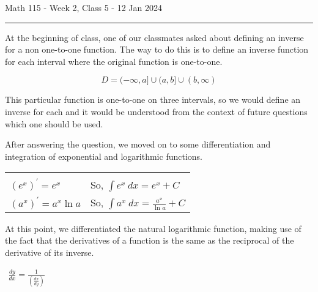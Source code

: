 \documentclass{article}
\begin{document}
Math 115 - Week 2, Class 5 - 12 Jan 2024
\hrule

\vspace{10pt}

At the beginning of class, one of our classmates asked about defining an inverse for a non one-to-one function. The way to do this is to define an inverse function for each interval where the original function is one-to-one.

\begin{center}
\end{center}

\[D=(-\infty,a]\cup(a,b]\cup(b,\infty)\]

This particular function is one-to-one on three intervals, so we would define an inverse for each and it would be understood from the context of future questions which one should be used.

\vspace{10pt}

After answering the question, we moved on to some differentiation and integration of exponential and logarithmic functions.

\begin{center}
\begin{tabular}{|ll|}
\hline&\\
$(e^x)^\prime=e^x$ & So, $\int e^x\ dx=e^x+C$\\[1em]
$(a^x)^\prime=a^x\ln a$ & So, $\int a^x\ dx=\frac{a^x}{\ln a}+C$\\[1em]
\hline
\end{tabular}
\end{center}

At this point, we differentiated the natural logarithmic function, making use of the fact that the derivatives of a function is the same as the reciprocal of the derivative of its inverse.

\begin{center}
$\boxed{\begin{gathered}
\frac{dy}{dx}=\frac{1}{\left(\frac{dx}{dy}\right)}
\end{gathered}}$
\end{center}
\end{document}

